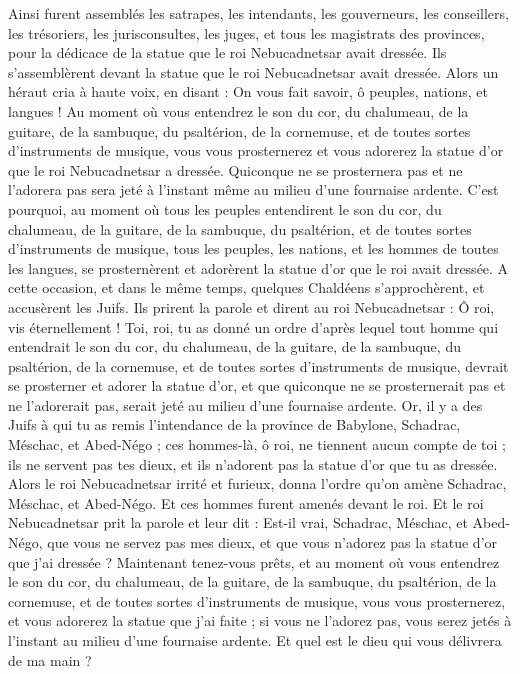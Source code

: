 \begin{multicols}{2}
Ainsi furent assemblés les satrapes, les intendants, les gouverneurs, les conseillers, les trésoriers, les jurisconsultes, les juges, et tous les magistrats des provinces, pour la dédicace de la statue que le roi Nebucadnetsar avait dressée.  Ils s’assemblèrent devant la statue que le roi Nebucadnetsar avait dressée.
Alors un héraut cria à haute voix, en disant : On vous fait savoir, ô peuples, nations, et langues !
Au moment où vous entendrez le son du cor, du chalumeau, de la guitare, de la sambuque, du psaltérion, de la cornemuse, et de toutes sortes d’instruments de musique, vous vous prosternerez et vous adorerez la statue d'or que le roi Nebucadnetsar a dressée.
Quiconque ne se prosternera pas et ne l’adorera pas sera jeté à l’instant même au milieu d’une fournaise ardente.
C'est pourquoi, au moment où tous les peuples entendirent le son du cor, du chalumeau, de la guitare, de la sambuque, du psaltérion, et de toutes sortes d’instruments de musique, tous les peuples, les nations, et les hommes de toutes les langues, se prosternèrent et adorèrent la statue d'or que le roi avait dressée.
A cette occasion, et dans le même temps, quelques Chaldéens s'approchèrent, et accusèrent les Juifs.
Ils prirent la parole et dirent au roi Nebucadnetsar : Ô roi, vis éternellement !
Toi, roi, tu as donné un ordre d’après lequel tout homme qui entendrait le son du cor, du chalumeau, de la guitare, de la sambuque, du psaltérion, de la cornemuse, et de toutes sortes d’instruments de musique, devrait se prosterner et adorer la statue d'or,
et que quiconque ne se prosternerait pas et ne l’adorerait pas, serait jeté au milieu d’une fournaise ardente.
Or, il y a des Juifs à qui tu as remis l’intendance de la province de Babylone, Schadrac, Méschac, et Abed-Négo ; ces hommes-là, ô roi, ne tiennent aucun compte de toi ; ils ne servent pas tes dieux, et ils n’adorent pas la statue d'or que tu as dressée.
Alors le roi Nebucadnetsar irrité et furieux, donna l’ordre qu'on amène Schadrac, Méschac, et Abed-Négo. Et ces hommes furent amenés devant le roi.
Et le roi Nebucadnetsar prit la parole et leur dit : Est-il vrai, Schadrac, Méschac, et Abed-Négo, que vous ne servez pas mes dieux, et que vous n’adorez pas la statue d'or que j'ai dressée ?
Maintenant tenez-vous prêts, et au moment où vous entendrez le son du cor, du chalumeau, de la guitare, de la sambuque, du psaltérion, de la cornemuse, et de toutes sortes d’instruments de musique, vous vous prosternerez, et vous adorerez la statue que j'ai faite ; si vous ne l’adorez pas, vous serez jetés à l’instant au milieu d’une fournaise ardente. Et quel est le dieu qui vous délivrera de ma main ?

\end{multicols}
